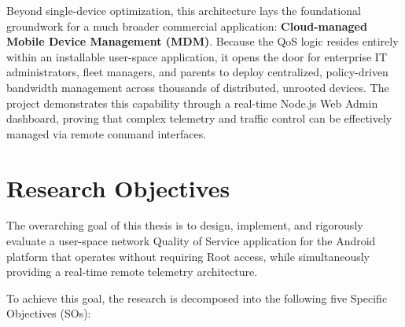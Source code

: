 Beyond single-device optimization, this architecture lays the foundational groundwork for a much broader commercial application: \textbf{Cloud-managed Mobile Device Management (MDM)}. Because the QoS logic resides entirely within an installable user-space application, it opens the door for enterprise IT administrators, fleet managers, and parents to deploy centralized, policy-driven bandwidth management across thousands of distributed, unrooted devices. The project demonstrates this capability through a real-time Node.js Web Admin dashboard, proving that complex telemetry and traffic control can be effectively managed via remote command interfaces.

\section{Research Objectives}
\label{sec:objectives}

The overarching goal of this thesis is to design, implement, and rigorously evaluate a user-space network Quality of Service application for the Android platform that operates without requiring Root access, while simultaneously providing a real-time remote telemetry architecture.

To achieve this goal, the research is decomposed into the following five Specific Objectives (SOs):

